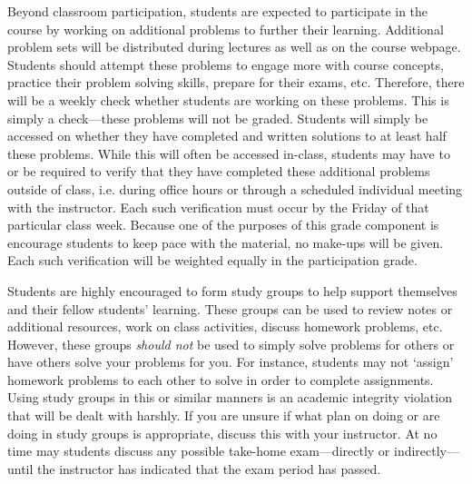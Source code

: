 \documentclass[11pt,letterpaper]{article}
\begin{document}
Beyond classroom participation, students are expected to participate in the course by working on additional problems to further their learning. Additional problem sets will be distributed during lectures as well as on the course webpage. Students should attempt these problems to engage more with course concepts, practice their problem solving skills, prepare for their exams, etc. Therefore, there will be a weekly check whether students are working on these problems. This is simply a check---these problems will not be graded. Students will simply be accessed on whether they have completed and written solutions to at least half these problems. While this will often be accessed in-class, students may have to or be required to verify that they have completed these additional problems outside of class, i.e. during office hours or through a scheduled individual meeting with the instructor. Each such verification must occur by the Friday of that particular class week. Because one of the purposes of this grade component is encourage students to keep pace with the material, no make-ups will be given. Each such verification will be weighted equally in the participation grade. \pspace

Students are highly encouraged to form study groups to help support themselves and their fellow students' learning. These groups can be used to review notes or additional resources, work on class activities, discuss homework problems, etc. However, these groups {\itshape should not} be used to simply solve problems for others or have others solve your problems for you. For instance, students may not `assign' homework problems to each other to solve in order to complete assignments. Using study groups in this or similar manners is an academic integrity violation that will be dealt with harshly. If you are unsure if what plan on doing or are doing in study groups is appropriate, discuss this with your instructor. At no time may students discuss any possible take-home exam---directly or indirectly---until the instructor has indicated that the exam period has passed. \sectionbreak
\end{document}
